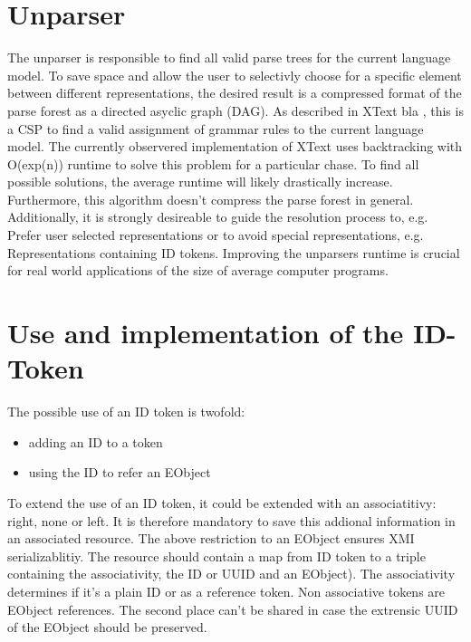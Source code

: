\section{Unparser}
The unparser is responsible to find all valid parse trees for the current language model. To save space and allow the user to selectivly choose for a specific element between different representations, the desired result is a compressed format of the parse forest as a directed asyclic graph (DAG).  As described in XText bla , this is a CSP to find a valid assignment of grammar rules to the current language model. The currently observered implementation of XText uses backtracking with O(exp(n)) runtime to solve this problem for a particular chase. To find all possible solutions, the average runtime will likely drastically increase. Furthermore, this algorithm doesn't compress the parse forest in general. Additionally, it is strongly desireable to guide the resolution process to, e.g. Prefer user selected representations or to avoid special representations, e.g. Representations containing ID tokens. Improving the unparsers runtime is crucial for real world applications of the size of average computer programs.

\section{Use and implementation of the ID-Token}
The possible use of an ID token is twofold:
\begin{itemize}
	\item adding an ID to a token
	\item using the ID to refer an EObject
\end{itemize}
To extend the use of an ID token, it could be extended with an associatitivy: right, none or left.
It is therefore mandatory to save this addional information in an associated resource. The above restriction to an EObject ensures XMI serializablitiy. The resource should contain a map from ID token to a triple containing the associativity, the ID or UUID and an EObject). The associativity determines if it's a plain ID or as a reference token. Non associative tokens are EObject references. The second place can't be shared in case the extrensic UUID of the EObject should be preserved.

